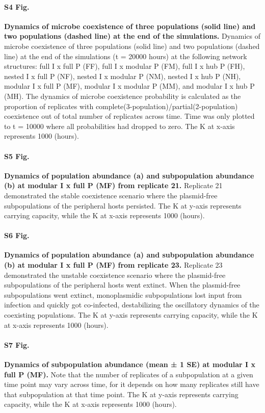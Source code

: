 \documentclass[10pt,letterpaper]{article}
\begin{document}
\paragraph*{S4 Fig.}
\label{S4_Fig}
{\bf Dynamics of microbe coexistence of three populations (solid line) and two populations (dashed line) at the end of the simulations.} Dynamics of microbe coexistence of three populations (solid line) and two populations (dashed line) at the end of the simulations (t = 20000 hours) at the following network structures: full I x full P (FF), full I x modular P (FM), full I x hub P (FH), nested I x full P (NF), nested I x modular P (NM), nested I x hub P (NH), modular I x full P (MF), modular I x modular P (MM), and modular I x hub P (MH). The dynamics of microbe coexistence probability is calculated as the proportion of replicates with complete(3-population)/partial(2-population) coexistence out of total number of replicates across time. Time was only plotted to t = 10000 where all probabilities had dropped to zero. The K at x-axis represents 1000 (hours).

\paragraph*{S5 Fig.}
\label{S5_Fig}
{\bf Dynamics of population abundance (a) and subpopulation abundance (b) at modular I x full P (MF) from replicate 21.} Replicate 21 demonstrated the stable coexistence scenario where the plasmid-free subpopulations of the peripheral hosts persisted. The K at y-axis represents carrying capacity, while the K at x-axis represents 1000 (hours).

\paragraph*{S6 Fig.}
\label{S6_Fig}
{\bf Dynamics of population abundance (a) and subpopulation abundance (b) at modular I x full P (MF) from replicate 23.} Replicate 23 demonstrated the unstable coexistence scenario where the plasmid-free subpopulations of the peripheral hosts went extinct. When the plasmid-free subpopulations went extinct, monoplasmidic subpopulations lost input from infection and quickly got co-infected, destabilizing the oscillatory dynamics of the coexisting populations. The K at y-axis represents carrying capacity, while the K at x-axis represents 1000 (hours).

\paragraph*{S7 Fig.}
\label{S7_Fig}
{\bf Dynamics of subpopulation abundance (mean ± 1 SE) at modular I x full P (MF).} Note that the number of replicates of a subpopulation at a given time point may vary across time, for it depends on how many replicates still have that subpopulation at that time point. The K at y-axis represents carrying capacity, while the K at x-axis represents 1000 (hours).
\end{document}
